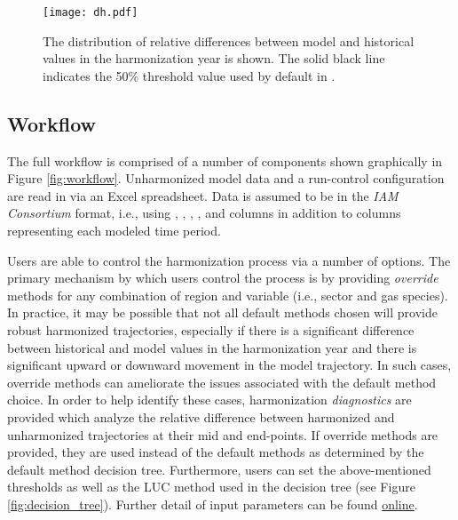 \begin{figure}
  \begin{center}
    \texttt{[image: dh.pdf]}
    \caption[]{
      \label{fig:dh}
      The distribution of relative differences between model and historical
      values in the harmonization year is shown. The solid black line indicates
      the 50\% threshold value used by default in .  
% 
% 
    }
  \end{center}
\end{figure}

\subsection{ Workflow}\label{sec:workflow}

The full  workflow is comprised of a number of components shown
graphically in Figure \ref{fig:workflow}. Unharmonized model data and a
run-control configuration are read in via an Excel spreadsheet. Data is assumed
to be in the \textit{IAM Consortium} format, i.e., using ,
, , , and  columns in
addition to columns representing each modeled time period. 

Users are able to control the harmonization process via a number of options. The
primary mechanism by which users control the process is by providing
\textit{override} methods for any combination of region and variable (i.e.,
sector and gas species).  In practice, it may be possible that not all default
methods chosen will provide robust harmonized trajectories, especially if there
is a significant difference between historical and model values in the
harmonization year and there is significant upward or downward movement in the
model trajectory. In such cases, override methods can ameliorate the issues
associated with the default method choice. In order to help identify these
cases, harmonization \textit{diagnostics} are provided which analyze the relative
difference between harmonized and unharmonized trajectories at their mid and
end-points. If override methods are provided, they are used instead of the
default methods as determined by the default method decision tree. Furthermore,
users can set the above-mentioned thresholds as well as the LUC method used in
the decision tree (see Figure \ref{fig:decision_tree}). Further detail of input
parameters can be found \href{http://mattgidden.com/aneris/config.html}{online}.

